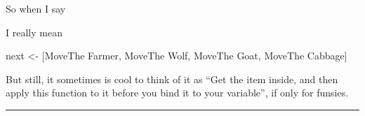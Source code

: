 \documentclass[]{article}
\newenvironment{Shaded}{}{}
\newcommand{\DataTypeTok}[1]{\textcolor[rgb]{0.56,0.13,0.00}{{#1}}}
\newcommand{\DecValTok}[1]{\textcolor[rgb]{0.25,0.63,0.44}{{#1}}}
\newcommand{\OtherTok}[1]{\textcolor[rgb]{0.00,0.44,0.13}{{#1}}}
\newcommand{\FunctionTok}[1]{\textcolor[rgb]{0.02,0.16,0.49}{{#1}}}
\newcommand{\NormalTok}[1]{{#1}}
\begin{document}
\begin{Shaded}
\end{Shaded}

So when I say

\begin{Shaded}
\end{Shaded}

I really mean

\begin{Shaded}
\begin{Highlighting}[]
\NormalTok{next }\OtherTok{<-} \NormalTok{[}\DataTypeTok{MoveThe} \DataTypeTok{Farmer}\NormalTok{, }\DataTypeTok{MoveThe} \DataTypeTok{Wolf}\NormalTok{, }\DataTypeTok{MoveThe} \DataTypeTok{Goat}\NormalTok{, }\DataTypeTok{MoveThe} \DataTypeTok{Cabbage}\NormalTok{]}
\end{Highlighting}
\end{Shaded}

But still, it sometimes is cool to think of it as ``Get the item inside,
and then apply this function to it before you bind it to your
variable'', if only for funsies.

\begin{center}\rule{0.5\linewidth}{\linethickness}\end{center}
\end{document}
